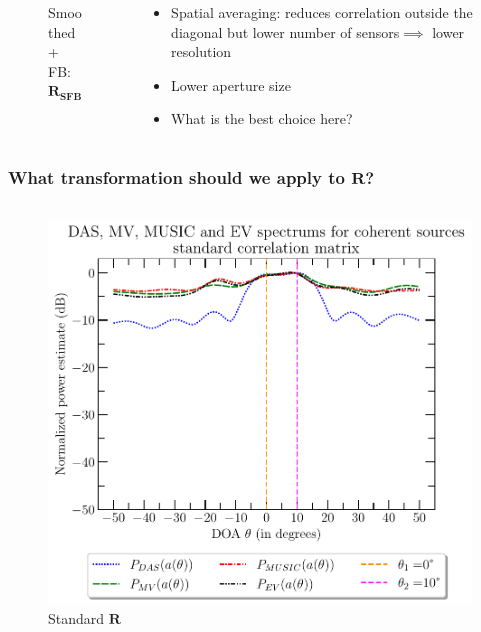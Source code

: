 \documentclass[UKenglish,8pt,aspectratio=1610]{beamer}
\begin{document}
\begin{frame}
\begin{columns}
\begin{column}{0.33\textwidth}
\begin{figure}[h!]
				\caption{Smoothed + FB: $\mathbf{R_{SFB}}$}
			\end{figure}
		\end{column}
		\begin{column}{0.33\textwidth}
			\begin{itemize}
				\item Spatial averaging: reduces correlation outside the diagonal but lower number of sensors$\implies$ lower resolution
			\item Lower aperture size
			\item What is the best choice here? 
			\end{itemize}
		\end{column}
	\end{columns}
\end{frame}

\begin{frame}
	\frametitle{What transformation should we apply to $\mathbf{R}$?}
	\vspace{-18pt}
	\begin{columns}
	\begin{column}{0.33\textwidth}
	\begin{figure}[h!]
		\centering
		\includegraphics[scale=0.27]{question8/spectrums/part_A_question_8_all_spectrums_standard_correlation_matrix}
		\caption{Standard $\mathbf{R}$}
	\end{figure}
\end{column}

\end{columns}
\end{frame}
\end{document}
